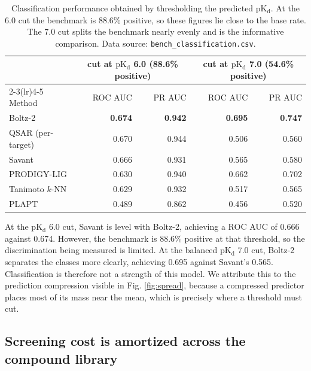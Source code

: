 \documentclass[11pt]{article}
\newcommand{\pkd}{\ensuremath{\mathrm{pK_d}}}
\begin{document}
\begin{table}[H]
\centering
\caption{Classification performance obtained by thresholding the predicted
\pkd. At the 6.0 cut the benchmark is 88.6\% positive, so these figures lie
close to the base rate. The 7.0 cut splits the benchmark nearly evenly and is
the informative comparison. Data source: \texttt{bench\_classification.csv}.}
\label{tab:clf}
\begin{tabular}{lrrrr}
\toprule
 & \multicolumn{2}{c}{cut at \pkd{} 6.0 (88.6\% positive)} & \multicolumn{2}{c}{cut at \pkd{} 7.0 (54.6\% positive)} \\
\cmidrule(lr){2-3}\cmidrule(lr){4-5}
Method & ROC AUC & PR AUC & ROC AUC & PR AUC \\
\midrule
Boltz-2           & \textbf{0.674} & \textbf{0.942} & \textbf{0.695} & \textbf{0.747} \\
QSAR (per-target) & 0.670 & 0.944 & 0.506 & 0.560 \\
Savant            & 0.666 & 0.931 & 0.565 & 0.580 \\
PRODIGY-LIG       & 0.630 & 0.940 & 0.662 & 0.702 \\
Tanimoto $k$-NN   & 0.629 & 0.932 & 0.517 & 0.565 \\
PLAPT             & 0.489 & 0.862 & 0.456 & 0.520 \\
\bottomrule
\end{tabular}
\end{table}

At the \pkd{} 6.0 cut, Savant is level with Boltz-2, achieving a ROC AUC of
0.666 against 0.674. However, the benchmark is 88.6\% positive at that
threshold, so the discrimination being measured is limited. At the balanced
\pkd{} 7.0 cut, Boltz-2 separates the classes more clearly, achieving 0.695
against Savant's 0.565. Classification is therefore not a strength of this
model. We attribute this to the prediction compression visible in Fig.
\ref{fig:spread}, because a compressed predictor places most of its mass near
the mean, which is precisely where a threshold must cut.

\subsection{Screening cost is amortized across the compound library}
\label{sec:runtime}
\end{document}
